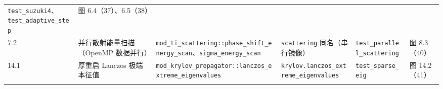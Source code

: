 \documentclass[
]{ctexbook}
\begin{document}
\begin{longtable}[]{@{}llllll@{}}
\begin{minipage}[t]{0.14\columnwidth}
\texttt{test\_suzuki4}、\texttt{test\_adaptive\_step}\strut
\end{minipage} & \begin{minipage}[t]{0.14\columnwidth}\raggedright
图 6.4（37）、6.5（38）\strut
\end{minipage}\tabularnewline
\begin{minipage}[t]{0.14\columnwidth}\raggedright
7.2\strut
\end{minipage} & \begin{minipage}[t]{0.14\columnwidth}\raggedright
并行散射能量扫描（OpenMP 数据并行）\strut
\end{minipage} & \begin{minipage}[t]{0.14\columnwidth}\raggedright
\texttt{mod\_ti\_scattering::phase\_shift\_energy\_scan}、\texttt{sigma\_energy\_scan}\strut
\end{minipage} & \begin{minipage}[t]{0.14\columnwidth}\raggedright
\texttt{scattering} 同名（串行镜像）\strut
\end{minipage} & \begin{minipage}[t]{0.14\columnwidth}\raggedright
\texttt{test\_parallel\_scattering}\strut
\end{minipage} & \begin{minipage}[t]{0.14\columnwidth}\raggedright
图 8.3（40）\strut
\end{minipage}\tabularnewline
\begin{minipage}[t]{0.14\columnwidth}\raggedright
14.1\strut
\end{minipage} & \begin{minipage}[t]{0.14\columnwidth}\raggedright
厚重启 Lanczos 极端本征值\strut
\end{minipage} & \begin{minipage}[t]{0.14\columnwidth}\raggedright
\texttt{mod\_krylov\_propagator::lanczos\_extreme\_eigenvalues}\strut
\end{minipage} & \begin{minipage}[t]{0.14\columnwidth}\raggedright
\texttt{krylov.lanczos\_extreme\_eigenvalues}\strut
\end{minipage} & \begin{minipage}[t]{0.14\columnwidth}\raggedright
\texttt{test\_sparse\_eig}\strut
\end{minipage} & \begin{minipage}[t]{0.14\columnwidth}\raggedright
图 14.2（41）\strut
\end{minipage}\tabularnewline
\begin{minipage}[t]{0.14\columnwidth}\raggedright

\end{minipage}
\end{longtable}
\end{document}
